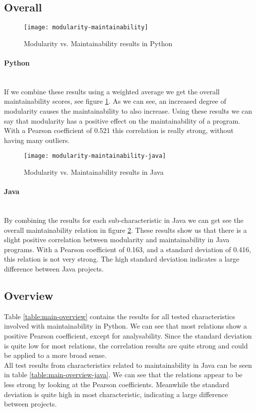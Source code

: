 \documentclass[twoside]{uva-inf-bachelor-thesis}
\newcommand{\myparagraph}[1]{\paragraph{#1}\mbox{}\\}
\begin{document}
\subsection{Overall}
\begin{figure}[H]
    \caption{Modularity vs. Maintainability results in Python}
    \label{figure:mod-main}
    \centering
        \texttt{[image: modularity-maintainability]}
\end{figure}

\myparagraph{Python}
If we combine these results using a weighted average we get the overall maintainability scores, see figure \ref{figure:mod-main}. As we can see, an increased degree of modularity causes the maintainability to also increase. Using these results we can say that modularity has a positive effect on the maintainability of a program. With a Pearson coefficient of 0.521 this correlation is really strong, without having many outliers.

\begin{figure}[H]
    \caption{Modularity vs. Maintainability results in Java}
    \label{figure:mod-main-java}
    \centering
        \texttt{[image: modularity-maintainability-java]}
\end{figure}

\myparagraph{Java}
By combining the results for each sub-characteristic in Java we can get see the overall maintainability relation in figure \ref{figure:mod-main-java}. These results show us that there is a slight positive correlation between modularity and maintainability in Java programs. With a Pearson coefficient of 0.163, and a standard deviation of 0.416, this relation is not very strong. The high standard deviation indicates a large difference between Java projects.

\subsection{Overview}
Table \ref{table:main-overview} contains the results for all tested characteristics involved with maintainability in Python. We can see that most relations show a positive Pearson coefficient, except for analysability. Since the standard deviation is quite low for most relations, the correlation results are quite strong and could be applied to a more broad sense.\\

All test results from characteristics related to maintainability in Java can be seen in table \ref{table:main-overview-java}. We can see that the relations appear to be less strong by looking at the Pearson coefficients. Meanwhile the standard deviation is quite high in most characteristic, indicating a large difference between projects.
\end{document}
